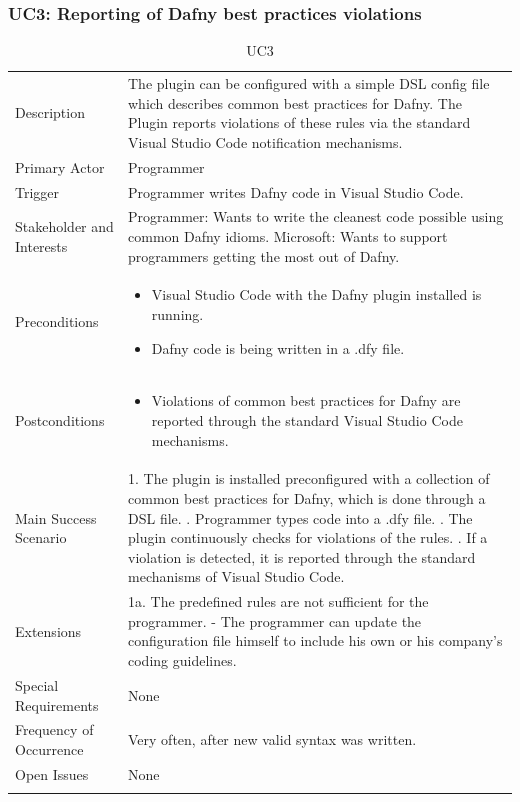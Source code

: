 \subsubsection{UC3: Reporting of Dafny best practices violations}
\begin{longtable}{l | p{} }
	Description & The plugin can be configured with a simple DSL config file which describes common best practices for Dafny. The Plugin reports violations of these rules via the standard Visual Studio Code notification mechanisms.\\ 
	Primary Actor & Programmer\\ 
	Trigger & Programmer writes Dafny code in Visual Studio Code.\\ 
	Stakeholder and Interests & Programmer: Wants to write the cleanest code possible using common Dafny idioms. \newline Microsoft: Wants to support programmers getting the most out of Dafny.\\ 
	Preconditions &
	\begin{itemize}
		\item Visual Studio Code with the Dafny plugin installed is running.
		\item Dafny code is being written in a .dfy file.
	\end{itemize}\\ 
	Postconditions &
	\begin{itemize}
		\item Violations of common best practices for Dafny are reported through the standard Visual Studio Code mechanisms.
	\end{itemize}\\ 
	Main Success Scenario & 
	1. The plugin is installed preconfigured with a collection of common best practices for Dafny, which is done through a DSL file. \newline
	2. Programmer types code into a .dfy file. \newline 
	3. The plugin continuously checks for violations of the rules. \newline 
	4. If a violation is detected, it is reported through the standard mechanisms of Visual Studio Code.\\ 
	Extensions & 
	1a. The predefined rules are not sufficient for the programmer. \newline 
	- The programmer can update the configuration file himself to include his own or his company's coding guidelines. \\ 
	Special Requirements & None\\ 
	Frequency of Occurrence & Very often, after new valid syntax was written.\\ 
	Open Issues & None \\ 
	\caption{UC3}
\end{longtable}

